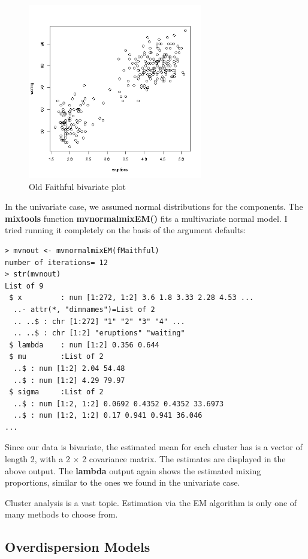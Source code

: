 \documentclass[11pt]{article}
\begin{document}
\begin{figure}[tb]
\centerline{
\includegraphics[width=3.0in]{BivarFaithful.png}
}
\caption{Old Faithful bivariate plot}
\label{bivariatefaithful}
\end{figure}

In the univariate case, we assumed normal distributions for the
components.  The \textbf{mixtools} function \textbf{mvnormalmixEM()} 
fits a multivariate normal model.  I tried running it completely on the
basis of the argument defaults:

\begin{lstlisting}
> mvnout <- mvnormalmixEM(fMaithful)
number of iterations= 12 
> str(mvnout)
List of 9
 $ x         : num [1:272, 1:2] 3.6 1.8 3.33 2.28 4.53 ...
  ..- attr(*, "dimnames")=List of 2
  .. ..$ : chr [1:272] "1" "2" "3" "4" ...
  .. ..$ : chr [1:2] "eruptions" "waiting"
 $ lambda    : num [1:2] 0.356 0.644
 $ mu        :List of 2
  ..$ : num [1:2] 2.04 54.48
  ..$ : num [1:2] 4.29 79.97
 $ sigma     :List of 2
  ..$ : num [1:2, 1:2] 0.0692 0.4352 0.4352 33.6973
  ..$ : num [1:2, 1:2] 0.17 0.941 0.941 36.046
...
\end{lstlisting}

Since our data is bivariate, the estimated mean for each cluster has
is a vector of length 2, with a 2 $\times$ 2 covariance matrix.  The
estimates are displayed in the above output.  The \textbf{lambda} output
again shows the estimated mixing proportions, similar to the ones we
found in the univariate case.

Cluster analysis is a vast topic.  Estimation via the EM algorithm is
only one of many methods to choose from.

\subsection{Overdispersion Models}
\end{document}
